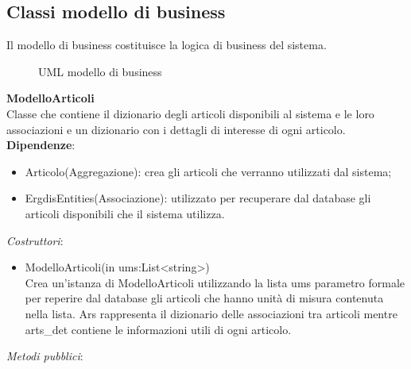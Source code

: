 \subsection{Classi modello di business} %
Il modello di business costituisce la logica di business del sistema.
\begin{figure}[!h] 
    \centering 
        \caption{UML modello di business}
    \end{figure}
\textbf{ModelloArticoli}\\
Classe che contiene il dizionario degli articoli disponibili al sistema e le loro associazioni e un dizionario con i dettagli di interesse di ogni articolo.
\textbf{Dipendenze}:
\begin{itemize}
    \item Articolo(Aggregazione): crea gli articoli che verranno utilizzati dal sistema;\\
    \item ErgdisEntities(Associazione): utilizzato per recuperare dal database gli articoli disponibili che il sistema utilizza.\\
\end{itemize}
\textit{Costruttori}:\\
\begin{itemize}
    \item ModelloArticoli(in ums:List<string>)\\
    Crea un'istanza di ModelloArticoli utilizzando la lista ums parametro formale per reperire dal database gli articoli che hanno unità di misura contenuta nella lista.
    Ars rappresenta il dizionario delle associazioni tra articoli mentre arts\_det contiene le informazioni utili di ogni articolo.
\end{itemize}
\textit{Metodi pubblici}:\\

